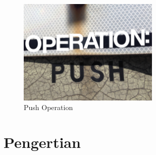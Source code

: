 
\begin{figure}[ht]
	\centerline{\includegraphics[width=0.60\textwidth]{Figures/dapgit3.jpg}}
	\caption{Push Operation}
	\label{Push Operation}
\end{figure}

\section {Pengertian }
